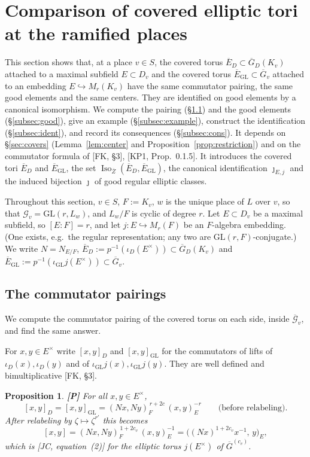 \documentclass[12pt]{article}
\newcommand{\ov}[1]{\overline{#1}}
\newcommand{\Iso}{\operatorname{Iso}}
\newcommand{\GL}{\mathrm{GL}}
\newcommand{\Gb}{\ov{G}}
\newcommand{\Zb}{\ov{Z}}
\newcommand{\GDb}{\ov{G}_D}
\newcommand{\Eb}{\ov{E}}
\newcommand{\cG}{\mathcal{G}}
\newcommand{\cGb}{\ov{\mathcal{G}}}
\newcommand{\iD}{\iota_D}
\newcommand{\iG}{\iota_{\GL}}
\newcommand{\jj}{\jmath}
\newcommand{\Pv}{\textbf{[P]}}
\theoremstyle{plain}
\newtheorem{proposition}[theorem]{Proposition}
\theoremstyle{definition}
\begin{document}
\section{Comparison of covered elliptic tori at the ramified places}\label{sec:tori}
This section shows that, at a place $v\in S$, the covered torus $\Eb_D\subset\GDb(K_v)$ attached to a maximal subfield $E\subset D_v$ and the covered torus $\Eb_{\GL}\subset\Gb_v$ attached to an embedding $E\hookrightarrow M_r(K_v)$ have the same commutator pairing, the same good elements and the same centers. They are identified on good elements by a canonical isomorphism. We compute the pairing (\S\ref{subsec:comm}) and the good elements (\S\ref{subsec:good}), give an example (\S\ref{subsec:example}), construct the identification (\S\ref{subsec:ident}), and record its consequences (\S\ref{subsec:cons}). It depends on \S\ref{sec:covers} (Lemma~\ref{lem:center} and Proposition~\ref{prop:restriction}) and on the commutator formula of [FK, \S3], [KP1, Prop.~0.1.5]. It introduces the covered tori $\Eb_D$ and $\Eb_{\GL}$, the set $\Iso_{\Zb}(\Eb_D,\Eb_{\GL})$, the canonical identification $\jj_{E,j}$ and the induced bijection $\jj$ of good regular elliptic classes.

Throughout this section, $v\in S$, $F:=K_v$, $w$ is the unique place of $L$ over $v$, so that $\cG_v=\GL(r,L_w)$, and $L_w/F$ is cyclic of degree $r$. Let $E\subset D_v$ be a maximal subfield, so $[E:F]=r$, and let $j:E\hookrightarrow M_r(F)$ be an $F$-algebra embedding. (One exists, e.g.\ the regular representation; any two are $\GL(r,F)$-conjugate.) We write $N=N_{E/F}$, $\Eb_D:=p^{-1}(\iD(E^\times))\subset\GDb(K_v)$ and $\Eb_{\GL}:=p^{-1}(\iG j(E^\times))\subset\Gb_v$.

\subsection{The commutator pairings}\label{subsec:comm}
We compute the commutator pairing of the covered torus on each side, inside $\cGb_v$, and find the same answer.

For $x,y\in E^\times$ write $[x,y]_D$ and $[x,y]_{\GL}$ for the commutators of lifts of $\iD(x),\iD(y)$ and of $\iG j(x),\iG j(y)$. They are well defined and bimultiplicative [FK, \S3].

\begin{proposition}\label{prop:comm}\Pv
For all $x,y\in E^\times$,
\begin{equation}\label{eq:commboth}
[x,y]_D=[x,y]_{\GL}=(Nx,Ny)_F^{\,r+2c}\,(x,y)_E^{-r}\qquad\text{(before relabeling)}.
\end{equation}
After relabeling by $\zeta\mapsto\zeta^{r'}$ this becomes
\begin{equation}\label{eq:commrelab}
[x,y]=(Nx,Ny)_F^{\,1+2c_v}\,(x,y)_E^{-1}=\big((Nx)^{1+2c_v}x^{-1},\,y\big)_E,
\end{equation}
which is [JC, equation~(2)] for the elliptic torus $j(E^\times)$ of $\Gb^{(c_v)}$.
\end{proposition}
\end{document}

